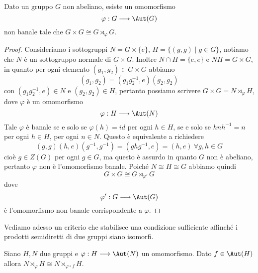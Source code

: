 \documentclass[11pt]{scrartcl}
\begin{document}
\begin{proposition}
    Dato un gruppo $G$ non abeliano, esiste un omomorfismo
    \[
        \varphi: G\longrightarrow \Aut(G)
    \]
    non banale tale che $G\times G \cong G\rtimes_{\varphi} G$.
\end{proposition}

\begin{proof}
    Consideriamo i sottogruppi $N = G\times\{e\}$, $H = \{(g, g) \mid g \in G\}$,
    notiamo che $N$ è un sottogruppo normale di $G\times G$. Inoltre 
    $N\cap H = \{e, e\}$ e $NH = G\times G$, in quanto per 
    ogni elemento $(g_1, g_2) \in G\times G$ abbiamo
    \[
        (g_1, g_2) = (g_1g_2^{-1}, e)(g_2, g_2)
    \]
    con $(g_1g_2^{-1}, e) \in N$ e $(g_2, g_2) \in H$, pertanto possiamo 
    scrivere $G \times G = N \rtimes_{\varphi} H$, dove $\varphi$ è un omomorfismo
    \[
        \varphi: H \longrightarrow \Aut(N)
    \]
    Tale $\varphi$ è banale se e solo se $\varphi(h) = id$ per ogni $h \in H$,
    se e solo se $hnh^{-1} = n$ per ogni $h \in H$, per ogni $n \in N$.
    Questo è equivalente a richiedere 
    \[
        (g, g)(h, e)(g^{-1}, g^{-1}) = (ghg^{-1}, e)= (h, e)~\forall g, h \in G
    \]
    cioè $g \in Z(G)$ per ogni $g \in G$,
    ma questo è assurdo in quanto $G$ non è abeliano, pertanto $\varphi$
    non è l'omomorfismo banale. Poiché $N \cong H \cong G$ abbiamo quindi
    \[
        G \times G \cong G\rtimes_{\varphi'}G
    \]
    dove
    \[
        \varphi':G \longrightarrow \Aut(G)
    \]
    è l'omomorfismo non banale corrispondente a $\varphi$.
\end{proof}

Vediamo adesso un criterio che stabilisce una condizione sufficiente affinché 
i prodotti semidiretti di due gruppi siano isomorfi.

\begin{proposition}
    \label{prop1.74}
    Siano $H, N$ due gruppi e $\varphi: H \longrightarrow \Aut(N)$ un omomorfismo.
    Dato $f \in \Aut(H)$ allora $N\rtimes_{\varphi} H \cong N\rtimes_{\varphi\circ f} H$.
\end{proposition}
\end{document}
